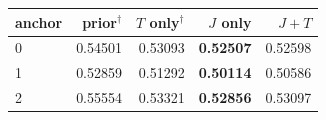 \begin{tabular}{@{}l r r r r@{}}
\toprule
anchor & prior$^\dagger$ & $T$ only$^\dagger$ & $J$ only & $J+T$ \\
\midrule
0 & 0.54501 & 0.53093 & \textbf{0.52507} & 0.52598 \\
1 & 0.52859 & 0.51292 & \textbf{0.50114} & 0.50586 \\
2 & 0.55554 & 0.53321 & \textbf{0.52856} & 0.53097 \\
\bottomrule
\end{tabular}
